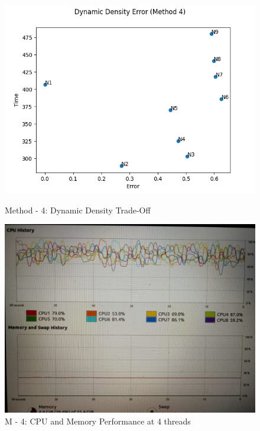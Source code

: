 \documentclass[paper=a4, fontsize = 12pt]{scrartcl}
\numberwithin{equation}{section}		%
\numberwithin{figure}{section}			%
\numberwithin{table}{section}				%
\begin{document}
\begin{figure}[H]
    \centering
    \captionsetup{justification=centering,margin=2cm}
    \includegraphics[width = 15cm]{method4_tradeoff_dynamic.png}
    \caption{Method - 4: Dynamic Density Trade-Off}
    \label{fig:M4DynamicTradeOff}
    
    \includegraphics[width = 14cm]{4_4.jpeg}
    \caption{M - 4: CPU and Memory Performance at 4 threads}
    \label{fig:M4CPUT4}
\end{figure}
\end{document}
